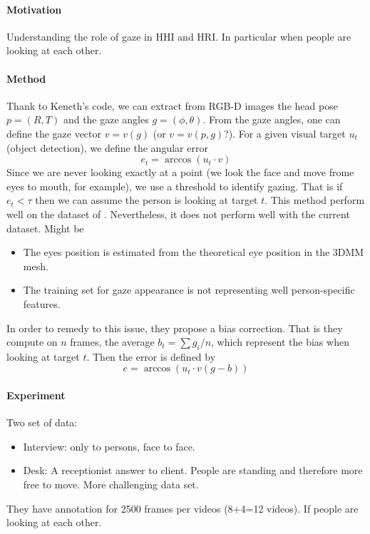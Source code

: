 \documentclass[11pt,a4paper]{article}
\begin{document}
\paragraph{Motivation}
Understanding the role of gaze in HHI and HRI. In particular when people are looking at each other.

\paragraph{Method}
Thank to Keneth's code, we can extract from RGB-D images the head pose $p=(R,T)$ and the gaze angles $g=(\phi,\theta)$. From the gaze angles, one can define the gaze vector $v=v(g)$ (or $v=v(p,g)$?). For a given visual target $u_t$ (object detection), we define the angular error
\begin{equation}
e_t = \arccos(u_t \cdot v)
\end{equation}
Since we are never looking exactly at a point (we look the face and move frome eyes to mouth, for example), we use a threshold to identify gazing. That is if $e_t<\tau$ then we can assume the person is looking at target $t$. This method perform well on the dataset of \cite{Funes2016}. Nevertheless, it does not perform well with the current dataset. Might be
\begin{itemize}
\item The eyes position is estimated from the theoretical eye position in the 3DMM mesh.
\item The training set for gaze appearance is not representing well person-specific features. 
\end{itemize}
In order to remedy to this issue, they propose a bias correction. That is they compute on $n$ frames, the average $b_t = \sum g_i / n$, which represent the bias when looking at target $t$. Then the error is defined by
\begin{equation}
e = \arccos (u_t \cdot v(g-b))
\end{equation}

\paragraph{Experiment}
Two set of data:
\begin{itemize}
\item Interview: only to persons, face to face.
\item Desk: A receptionist answer to client. People are standing and therefore more free to move. More challenging data set.
\end{itemize}
They have annotation for 2500 frames per videos (8+4=12 videos). If people are looking at each other.
\end{document}

